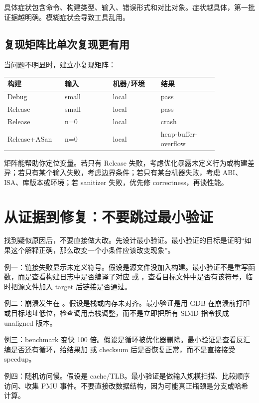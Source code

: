 具体症状包含命令、构建类型、输入、错误形式和对比对象。症状越具体，第一批证据越明确。模糊症状会导致工具乱用。

\subsection{复现矩阵比单次复现更有用}

当问题不明显时，建立小复现矩阵：

\begin{center}
\begin{tabular}{p{0.20\linewidth}p{0.20\linewidth}p{0.20\linewidth}p{0.24\linewidth}}
\toprule
构建 & 输入 & 机器/环境 & 结果 \\
\midrule
Debug & small & local & pass \\
Release & small & local & pass \\
Release & n=0 & local & crash \\
Release+ASan & n=0 & local & heap-buffer-overflow \\
\bottomrule
\end{tabular}
\end{center}

矩阵能帮助你定位变量。若只有 Release 失败，考虑优化暴露未定义行为或构建差异；若只有某个输入失败，考虑边界条件；若只有某台机器失败，考虑 ABI、ISA、库版本或环境；若 sanitizer 失败，优先修 correctness，再谈性能。

\section{从证据到修复：不要跳过最小验证}

找到疑似原因后，不要直接做大改。先设计最小验证。最小验证的目标是证明“如果这个解释正确，那么改变一个小条件应该改变现象”。

例一：链接失败显示未定义符号。假设是源文件没加入构建。最小验证不是重写函数，而是查看构建日志中是否编译了对应  或 ，查看目标文件中是否有该符号，临时把源文件加入 target 后链接是否通过。

例二：崩溃发生在 。假设是栈或内存未对齐。最小验证是用 GDB 在崩溃前打印  或目标地址低位，检查调用点栈调整，而不是立即把所有 SIMD 指令换成 unaligned 版本。

例三：benchmark 变快 100 倍。假设是循环被优化器删除。最小验证是查看反汇编是否还有循环，给结果加  或 checksum 后是否恢复正常，而不是直接接受 speedup。

例四：随机访问慢。假设是 cache/TLB。最小验证是做输入规模扫描、比较顺序访问、收集 PMU 事件。不要直接改数据结构，因为可能真正瓶颈是分支或哈希计算。

